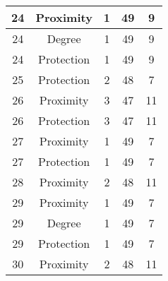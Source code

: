 \documentclass[results.tex]{subfiles}
\begin{document}
\begin{center}
\begin{tabular}{| c || c | c | c | c |}
            \hline
            24                      & Proximity                    & 1                      & 49                      & 9                    \\
            \hline
            24                      & Degree                       & 1                      & 49                      & 9                    \\
            \hline
            24                      & Protection                   & 1                      & 49                      & 9                    \\
            \hline
            25                      & Protection                   & 2                      & 48                      & 7                    \\
            \hline
            26                      & Proximity                    & 3                      & 47                      & 11                   \\
            \hline
            26                      & Protection                   & 3                      & 47                      & 11                   \\
            \hline
            27                      & Proximity                    & 1                      & 49                      & 7                    \\
            \hline
            27                      & Protection                   & 1                      & 49                      & 7                    \\
            \hline
            28                      & Proximity                    & 2                      & 48                      & 11                   \\
            \hline
            29                      & Proximity                    & 1                      & 49                      & 7                    \\
            \hline
            29                      & Degree                       & 1                      & 49                      & 7                    \\
            \hline
            29                      & Protection                   & 1                      & 49                      & 7                    \\
            \hline
            30                      & Proximity                    & 2                      & 48                      & 11                   \\

\end{tabular}
\end{center}
\end{document}
